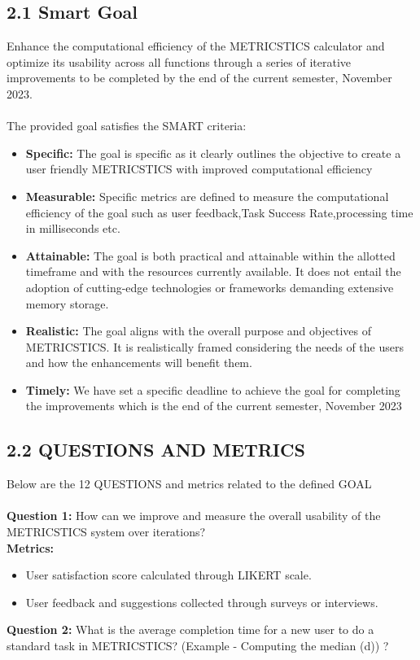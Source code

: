 \subsection{2.1 Smart Goal}
\vspace{10pt}
\normalsize{Enhance the computational efficiency of the METRICSTICS calculator and optimize its usability across all functions through a series of iterative improvements to be completed by the end of the current semester, November 2023. }\\
\\The provided goal satisfies the SMART criteria:
\begin{itemize}
\item \textbf{Specific:} The goal is specific as it clearly outlines the objective to create a user friendly METRICSTICS with improved computational efficiency
\item \textbf{Measurable:} Specific metrics are defined to measure the computational efficiency of the goal such as user feedback,Task Success Rate,processing time in milliseconds etc. 
\item \textbf{Attainable:} The goal is both practical and attainable within the allotted timeframe and with the resources currently available. It does not entail the adoption of cutting-edge technologies or frameworks demanding extensive memory storage.
\item \textbf{Realistic:} The goal aligns with the overall purpose and objectives of METRICSTICS. It is realistically framed considering the needs of the users and how the enhancements will benefit them.
\item \textbf{Timely:} We have set a specific deadline to achieve the goal for completing the improvements which is the end of the current semester, November 2023
\end{itemize}

\subsection{2.2 QUESTIONS AND METRICS}
Below are the 12 QUESTIONS and metrics related to the defined GOAL  \\ \\
\textbf{Question 1:} How can we improve and measure the overall usability of the METRICSTICS system over iterations?
 \\
 
\textbf{Metrics:}
\begin{itemize}
    \item User satisfaction score calculated through LIKERT scale.
    \item User feedback and suggestions collected through surveys or interviews.
\end{itemize} 
\vspace{10pt}
\textbf{Question 2:} What is the average completion time for a new user to do a standard task in METRICSTICS? (Example - Computing the median (d)) ? \\

